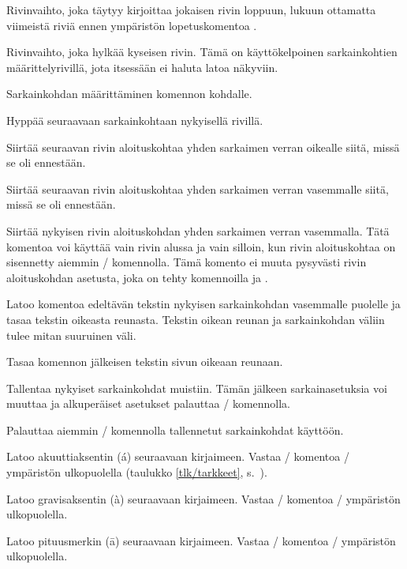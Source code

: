 \begin{maaritelma}{}
\item [\keno] Rivinvaihto, joka täytyy kirjoittaa jokaisen rivin
  loppuun, lukuun ottamatta viimeistä riviä ennen ympäristön
  lopetuskomentoa .
\item [kill] Rivinvaihto, joka hylkää kyseisen rivin. Tämä on
  käyttökelpoinen sarkainkohtien määrittelyrivillä, jota itsessään ei
  haluta latoa näkyviin.
\item [=] Sarkainkohdan määrittäminen komennon kohdalle.
\item [>] Hyppää seuraavaan sarkainkohtaan nykyisellä rivillä.
\item [+] Siirtää seuraavan rivin aloituskohtaa yhden sarkaimen verran
  oikealle siitä, missä se oli ennestään.
\item [-] Siirtää seuraavan rivin aloituskohtaa yhden sarkaimen verran
  vasemmalle siitä, missä se oli ennestään.
\item [<] Siirtää nykyisen rivin aloituskohdan yhden sarkaimen verran
  vasemmalla. Tätä komentoa voi käyttää vain rivin alussa ja vain
  silloin, kun rivin aloituskohtaa on sisennetty aiemmin \komento{+}\-/
  komennolla. Tämä komento ei muuta pysyvästi rivin aloituskohdan
  asetusta, joka on tehty komennoilla \komento{+} ja \komento{-}.
\item ['] Latoo komentoa edeltävän tekstin nykyisen sarkainkohdan
  vasemmalle puolelle ja tasaa tekstin oikeasta reunasta. Tekstin oikean
  reunan ja sarkainkohdan väliin tulee mitan 
  suuruinen väli.
\item [`] Tasaa komennon jälkeisen tekstin sivun oikeaan reunaan.
\item [pushtabs] Tallentaa nykyiset sarkainkohdat muistiin. Tämän
  jälkeen sarkainasetuksia voi muuttaa ja alkuperäiset asetukset
  palauttaa \-/ komennolla.
\item [poptabs] Palauttaa aiemmin \-/ komennolla
  tallennetut sarkainkohdat käyttöön.
\item [a'] Latoo akuuttiaksentin (\'a) seuraavaan kirjaimeen. Vastaa
  \-/ komentoa \-/ ympäristön ulkopuolella
  (taulukko \ref{tlk/tarkkeet}, s.~\pageref{tlk/tarkkeet}).
\item [a`] Latoo gravisaksentin (\`a) seuraavaan kirjaimeen. Vastaa
  \-/ komentoa \-/ ympäristön
  ulkopuolella.
\item [a=] Latoo pituusmerkin (\=a) seuraavaan kirjaimeen. Vastaa
  \komento{=}\-/ komentoa \-/ ympäristön
  ulkopuolella.
\end{maaritelma}

